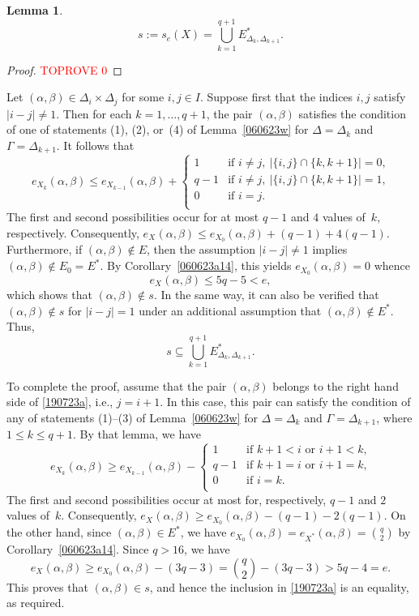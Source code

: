 \documentclass{amsart}
\newtheorem{lemma}[formula]{Lemma}
\def\qtnl#1{\begin{equation}\label{#1}}
\def\eqtn{\end{equation}}
\def\lmml#1{\begin{lemma}\label{#1}}
\def\elmm{\end{lemma}}
\def\css{\begin{cases}}
\def\ecss{\end{cases}}
\def\prf{\begin{proof}\textcolor{red}{TOPROVE 0}\end{proof}}
\begin{document}
\lmml{160623a}
$$
s:=s_e(X)=\bigcup_{k=1}^{q+1}E^*_{\Delta_k,\Delta_{k+1}}.
$$
\elmm
\prf
Let $(\alpha,\beta)\in \Delta_i\times\Delta_j$ for some $i,j\in I$.
Suppose first that the indices $i,j$ satisfy $|i-j|\ne 1$. 
Then for each $k=1,\ldots,q+1$, the pair $(\alpha,\beta)$ satisfies the condition  of one of statements (1), (2), or~(4) of Lemma~\ref{060623w} for $\Delta=\Delta_k$ and $\Gamma=\Delta_{k+1}$. It follows that
$$
e_{X_k}(\alpha,\beta)\le e_{X_{k-1}}(\alpha,\beta)+
\css
1     &\text{if $i\ne j,\  |\{i,j\}\cap\{k,k+1\}|=0$,}\\   q-1 &\text{if $i\ne j,\  |\{i,j\}\cap\{k,k+1\}|=1$,}\\ 0    &\text{if $i=j$.}\\
\ecss
$$
The first and second possibilities occur for at most $q-1$ and $4$ values of~$k$, respectively. Consequently, $e_{X^{}}(\alpha,\beta)\le e_{X_0}(\alpha,\beta)+(q-1)+4(q-1)$. Furthermore, if $(\alpha,\beta)\not\in E$, then the assumption  $|i-j|\ne 1$ implies $(\alpha,\beta)\not\in E_0=E^*$. By Corollary~\ref{060623a14}, this yields $e_{X_0}(\alpha,\beta)=0$ whence
$$
e_{X^{}}(\alpha,\beta)\le 5q-5<e,
$$
which shows that $(\alpha,\beta)\not\in s$. In the same way, it 
can also be verified that $(\alpha,\beta)\not\in s$ 
for $|i-j|=1$ under an additional assumption that $(\alpha,\beta)\not\in E^*$. Thus,
\qtnl{190723a}
s\subseteq \bigcup_{k=1}^{q+1} E^*_{\Delta_k,\Delta_{k+1}}.
\eqtn

To complete the proof, assume that the pair $(\alpha,\beta)$ belongs to the right hand side of \eqref{190723a},  i.e., $j=i+1$.  In this case, this pair can satisfy the condition of any of statements (1)--(3) of Lemma~\ref{060623w} for $\Delta=\Delta_k$ and $\Gamma=\Delta_{k+1}$, where $1\le k\le q+1$. 
By that lemma, we have
$$
e_{X_k}(\alpha,\beta)\ge  e_{X_{k-1}}(\alpha,\beta)-
\css
1     &\text{if $k+1<i$ or $i+1< k$,}\\
q-1 &\text{if $k+1=i$ or $i+1=k$,}\\
0    &\text{if $i=k$.}\\
\ecss
$$
The first and second possibilities occur at most for, respectively, 
$q-1$ and $2$ values of~$k$.
Consequently, $e_{X^{}}(\alpha,\beta)\ge e_{X_0}(\alpha,\beta)-(q-1)-2(q-1)$. On the other hand, since $(\alpha,\beta)\in E^*$, we have  $e_{X_0}(\alpha,\beta)= e_{X^*}(\alpha,\beta)=\binom{q}{2}$ by Corollary~\ref{060623a14}. Since $q>16$, we have
$$
e_{X^{}}(\alpha,\beta)\ge e_{X_0}(\alpha,\beta)-(3q-3)=\binom{q}{2}-(3q-3)>5q-4=e.
$$
This proves that $(\alpha,\beta)\in s$, and hence the inclusion in \eqref{190723a} is an equality, as required.
\eprf
\end{document}
